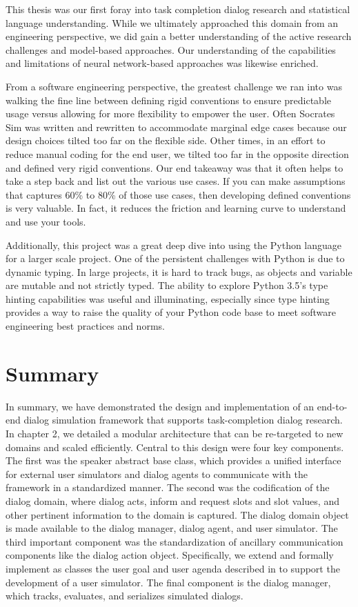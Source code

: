 This thesis was our first foray into task completion dialog research and statistical language understanding. While we ultimately approached this domain from an engineering perspective, we did gain a better understanding of the active research challenges and model-based approaches. Our understanding of the capabilities and limitations of neural network-based approaches was likewise enriched. 

From a software engineering perspective, the greatest challenge we ran into was walking the fine line between defining rigid conventions to ensure predictable usage versus allowing for more flexibility to empower the user. Often Socrates Sim was written and rewritten to accommodate marginal edge cases because our design choices tilted too far on the flexible side. Other times, in an effort to reduce  manual coding for the end user, we tilted too far in the opposite direction and defined very rigid conventions. Our end takeaway was that it often helps to take a step back and list out the various use cases. If you can make assumptions that captures 60\% to 80\% of those use cases, then developing defined conventions is very valuable. In fact, it reduces the friction and learning curve to understand and use your tools.

Additionally, this project was a great deep dive into using the Python language for a larger scale project. One of the persistent challenges with Python is due to dynamic typing. In large projects, it is hard to track bugs, as objects and variable are mutable and not strictly typed. The ability to explore Python 3.5's type hinting capabilities was useful and illuminating, especially since type hinting provides a way to raise the quality of your Python code base to meet software engineering best practices and norms.

\section{Summary}

In summary, we have demonstrated the design and implementation of an end-to-end dialog simulation framework that supports task-completion dialog research. In chapter 2, we detailed a modular architecture that can be re-targeted to new domains and scaled efficiently. Central to this design were four key components. The first was the speaker abstract base class, which provides a unified interface for external user simulators and dialog agents to communicate with the framework in a standardized manner. The second was the codification of the dialog domain, where dialog acts, inform and request slots and slot values, and other pertinent information to the domain is captured. The dialog domain object is made available to the dialog manager, dialog agent, and user simulator. The third important component was the standardization of ancillary communication components like the dialog action object. Specifically, we extend and formally implement as classes the user goal and user agenda described in \cite{Schatzmann2009TheHA} to support the development of a user simulator. The final component is the dialog manager, which tracks, evaluates, and serializes simulated dialogs. 

